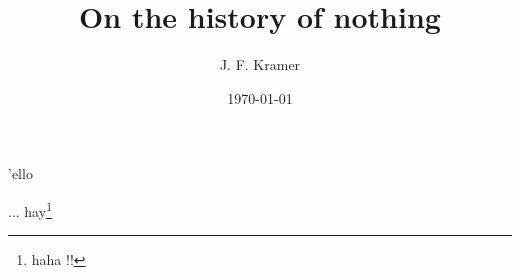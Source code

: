 \documentclass{book}
\title{On the history of nothing}
\author{J. F. Kramer}
\date{\today}
\begin{document}
\maketitle

'ello

\newpage

\iffootnote
...
\else
hay\footnote{haha \iffootnote !!\fi}
\fi

\end{document}
